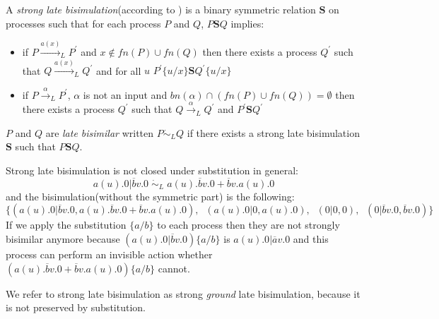 \begin{definition}
  A \emph{strong late bisimulation}(according to \cite{parrow}) is a binary symmetric relation $\mathbf{S}$ on processes such that for each process $P$ and $Q$, $P\mathbf{S}Q$ implies:
  \begin{itemize}
    \item
      if $P \xrightarrow{a(x)}_{L} P^{'}$ and $x\notin fn(P)\cup fn(Q)$ then there exists a process $Q^{'}$ such that $Q \xrightarrow{a(x)}_{L} Q^{'}$ and for all $u$ $P^{'}\{u/x\}\mathbf{S}Q^{'}\{u/x\}$
    \item 
      if $P \xrightarrow{\alpha}_{L} P^{'}$, $\alpha$ is not an input and $bn(\alpha) \cap (fn(P)\cup fn(Q)) = \emptyset$ then there exists a process $Q^{'}$ such that $Q \xrightarrow{\alpha}_{L} Q^{'}$ and $P^{'}\mathbf{S}Q^{'}$
  \end{itemize}
  $P$ and $Q$ are \emph{late bisimilar} written $P\dot{\sim}_{L}Q$ if there exists a strong late bisimulation $\mathbf{S}$ such that $P\mathbf{S}Q$.
\end{definition}

\begin{example}
  Strong late bisimulation is not closed under substitution in general:
  \[
    a(u).0|\overline{b}v.0\; \dot{\sim}_{L}\; a(u).\overline{b}v.0 + \overline{b}v.a(u).0
  \]
  and the bisimulation(without the symmetric part) is  the following:
  \[
    \{(a(u).0|\overline{b}v.0, a(u).\overline{b}v.0 + \overline{b}v.a(u).0),\;\; (a(u).0|0,a(u).0),\;\; (0|0,0),\;\; (0|\overline{b}v.0,\overline{b}v.0)\} 
  \]
  If we apply the substitution $\{a/b\}$ to each process then they are not strongly bisimilar anymore because $(a(u).0|\overline{b}v.0)\{a/b\}$ is $a(u).0|\overline{a}v.0$ and this process can perform an invisible action whether $(a(u).\overline{b}v.0 + \overline{b}v.a(u).0)\{a/b\}$ cannot.
\end{example}

We refer to strong late bisimulation as strong \emph{ground} late bisimulation, because it is not preserved by substitution.


